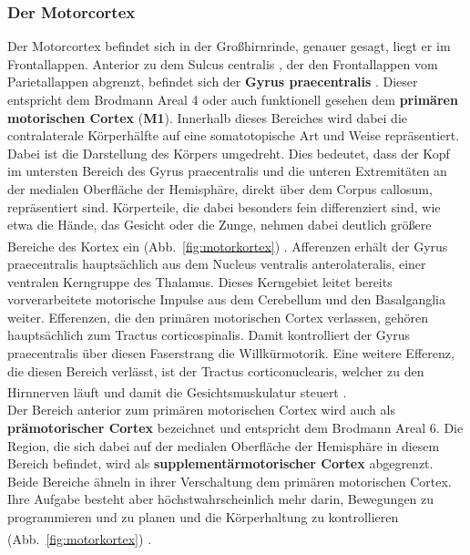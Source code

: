 \subsubsection*{Der Motorcortex} 
Der Motorcortex befindet sich in der Großhirnrinde, genauer gesagt, liegt er im Frontallappen. Anterior zu dem Sulcus centralis , der den Frontallappen vom Parietallappen abgrenzt, befindet sich der \textbf{Gyrus praecentralis} . Dieser entspricht dem Brodmann Areal 4 oder auch funktionell gesehen dem \textbf{primären motorischen Cortex}  (\textbf{M1}). Innerhalb dieses Bereiches wird dabei die contralaterale Körperhälfte auf eine somatotopische Art und Weise repräsentiert. Dabei ist die Darstellung des Körpers umgedreht. Dies bedeutet, dass der Kopf im untersten Bereich des Gyrus praecentralis und die unteren Extremitäten an der medialen Oberfläche der Hemisphäre, direkt über dem Corpus callosum, repräsentiert sind. Körperteile, die dabei besonders fein differenziert sind, wie etwa die Hände, das Gesicht oder die Zunge, nehmen dabei deutlich größere Bereiche des Kortex ein (Abb.~\ref{fig:motorkortex}) \textsuperscript{\cite[13]{crossman2014neuroanatomy}}. Afferenzen erhält der Gyrus praecentralis hauptsächlich aus dem Nucleus ventralis anterolateralis, einer ventralen Kerngruppe des Thalamus. Dieses Kerngebiet leitet bereits vorverarbeitete motorische Impulse aus dem Cerebellum und den Basalganglia weiter. Efferenzen, die den primären motorischen Cortex verlassen, gehören hauptsächlich zum Tractus corticospinalis. Damit kontrolliert der Gyrus praecentralis über diesen Faserstrang die Willkürmotorik. Eine weitere Efferenz, die diesen Bereich verlässt, ist der Tractus corticonuclearis, welcher zu den Hirnnerven läuft und damit die Gesichtsmuskulatur steuert \textsuperscript{\cite[9]{trepel2011neuroanatomie}}. \\
Der Bereich anterior zum primären motorischen Cortex wird auch als \textbf{prämotorischer Cortex}  bezeichnet und entspricht dem Brodmann Areal 6. Die Region, die sich dabei auf der medialen Oberfläche der Hemisphäre in diesem Bereich befindet, wird als \textbf{supplementärmotorischer Cortex}  abgegrenzt. Beide Bereiche ähneln in ihrer Verschaltung dem primären motorischen Cortex. Ihre Aufgabe besteht aber höchstwahrscheinlich mehr darin, Bewegungen zu programmieren und zu planen und die Körperhaltung zu kontrollieren (Abb.~\ref{fig:motorkortex}) \textsuperscript{\cite[13]{crossman2014neuroanatomy}}. 

